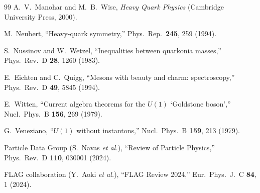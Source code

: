 \documentclass[11pt,a4paper]{article}
\theoremstyle{plain}
\begin{document}
\begin{thebibliography}{99}
  A.~V.~Manohar and M.~B.~Wise,
  \textit{Heavy Quark Physics}
  (Cambridge University Press, 2000).

  M.~Neubert,
  ``Heavy-quark symmetry,''
  Phys.\ Rep.\ \textbf{245}, 259 (1994).

  S.~Nussinov and W.~Wetzel,
  ``Inequalities between quarkonia masses,''
  Phys.\ Rev.\ D \textbf{28}, 1260 (1983).

  E.~Eichten and C.~Quigg,
  ``Mesons with beauty and charm: spectroscopy,''
  Phys.\ Rev.\ D \textbf{49}, 5845 (1994).

  E.~Witten,
  ``Current algebra theorems for the $U(1)$ `Goldstone boson',''
  Nucl.\ Phys.\ B \textbf{156}, 269 (1979).

  G.~Veneziano,
  ``$U(1)$ without instantons,''
  Nucl.\ Phys.\ B \textbf{159}, 213 (1979).

  Particle Data Group (S.~Navas \textit{et al.}),
  ``Review of Particle Physics,''
  Phys.\ Rev.\ D \textbf{110}, 030001 (2024).

  FLAG collaboration (Y.~Aoki \textit{et al.}),
  ``FLAG Review 2024,''
  Eur.\ Phys.\ J.\ C \textbf{84}, 1 (2024).

\end{thebibliography}
\end{document}

